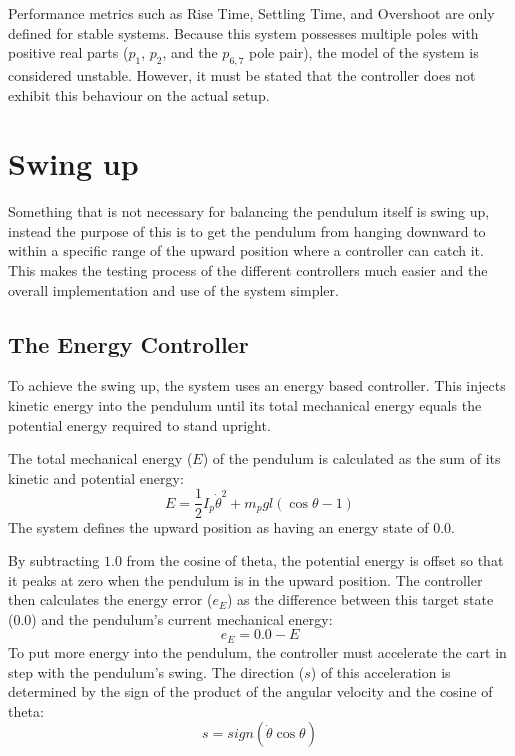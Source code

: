Performance metrics such as Rise Time, Settling Time, and Overshoot are only defined for stable systems. Because this system possesses multiple poles with positive real parts ($p_1$, $p_2$, and the $p_{6,7}$ pole pair), the model of the system is considered unstable. However, it must be stated that the controller does not exhibit this behaviour on the actual setup.

\section{Swing up}
Something that is not necessary for balancing the pendulum itself is swing up, instead the purpose of this is to get the pendulum from hanging downward to within a specific range of the upward position where a controller can catch it. This makes the testing process of the different controllers much easier and the overall implementation and use of the system simpler.

\subsection{The Energy Controller}
To achieve the swing up, the system uses an energy based controller. This injects kinetic energy into the pendulum until its total mechanical energy equals the potential energy required to stand upright.

The total mechanical energy ($E$) of the pendulum is calculated as the sum of its kinetic and potential energy:
\begin{equation}
	\label{System energy}
	E = \frac{1}{2} I_p \dot{\theta}^2 + m_p g l (\cos\theta - 1)
\end{equation}
The system defines the upward position as having an energy state of 0.0.

By subtracting $1.0$ from the cosine of theta, the potential energy is offset so that it peaks at zero when the pendulum is in the upward position. The controller then calculates the energy error ($e_E$) as the difference between this target state (0.0) and the pendulum's current mechanical energy:
\begin{equation}
	\label{Energy error}
	e_E = 0.0 - E
\end{equation}
To put more energy into the pendulum, the controller must accelerate the cart in step with the pendulum's swing. The direction ($s$) of this acceleration is determined by the sign of the product of the angular velocity and the cosine of theta:
\begin{equation}
	\label{Cart travel direction}
	s = sign(\dot{\theta} \cos\theta)
\end{equation}

